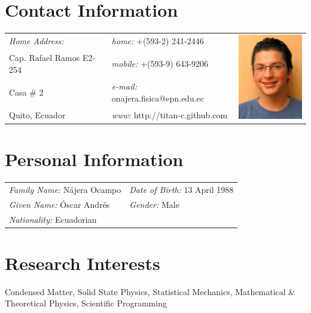 \documentclass[margin,line]{res}
\begin{document}

\begin{resume}

\section{\sc Contact Information}
  \begin{tabular}{@{}p{2in}p{2.5in}p{3cm} }
    {\it Home Address:}		& {\it home:}  +(593-2) 241-2446 &
      \multirow{4}{*}{ \includegraphics[width=3cm,bb=0 0 500 665]{./foto.jpg}}\\
    Cap. Rafael Ramos E2-254	& {\it mobile:} +(593-9) 643-9206 \\
    Casa \# 2			& {\it e-mail:}  onajera.fisica@epn.edu.ec\\
    Quito, Ecuador		& {\it www:} http://titan-c.github.com
  \end{tabular}\vspace{0.5cm}

\section{\sc Personal Information}
 \begin{tabular}{ll}
  {\it Family Name:} Nájera Ocampo & {\it Date of Birth:} 13 April 1988\\
  {\it Given Name:} Óscar Andrés   & {\it Gender:} Male\\
  {\it Nationality:} Ecuadorian    & %
 \end{tabular}

\section{\sc Research Interests}
  Condensed Matter, Solid State Physics, Statistical Mechanics, Mathematical \& Theoretical Physics, Scientific Programming


\end{resume}
\end{document}

